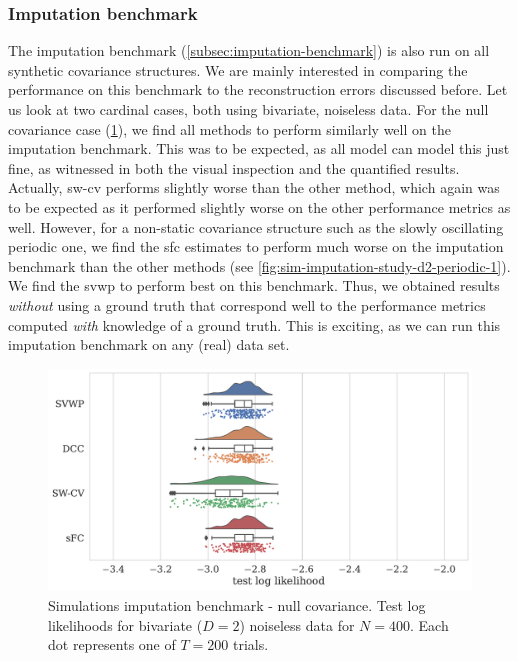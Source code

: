 \subsubsection{Imputation benchmark}

The imputation benchmark (\cref{subsec:imputation-benchmark}) is also run on all synthetic covariance structures.
We are mainly interested in comparing the performance on this benchmark to the reconstruction errors discussed before.
%
Let us look at two cardinal cases, both using bivariate, noiseless data.
For the null covariance case (\cref{fig:sim-imputation-study-d2-null}), we find all methods to perform similarly well on the imputation benchmark.
This was to be expected, as all model can model this just fine, as witnessed in both the visual inspection and the quantified results.
Actually, \gls{sw-cv} performs slightly worse than the other method, which again was to be expected as it performed slightly worse on the other performance metrics as well.
However, for a non-static covariance structure such as the slowly oscillating periodic one, we find the \gls{sfc} estimates to perform much worse on the imputation benchmark than the other methods (see \cref{fig:sim-imputation-study-d2-periodic-1}).
We find the \gls{svwp} to perform best on this benchmark.
Thus, we obtained results \emph{without} using a ground truth that correspond well to the performance metrics computed \emph{with} knowledge of a ground truth.
This is exciting, as we can run this imputation benchmark on any (real) data set.


\begin{figure}[t]
  \centering
  \includegraphics[width=\textwidth]{fig/sim/d2/N0400_T0200/imputation_study/LEOO_no_noise_test_log_likelihoods_raincloud_null}
  \caption{
    Simulations imputation benchmark - null covariance.
    Test log likelihoods for bivariate ($D = 2$) noiseless data for $N = 400$.
    Each dot represents one of $T = 200$ trials.
  }
  \label{fig:sim-imputation-study-d2-null}
\end{figure}


